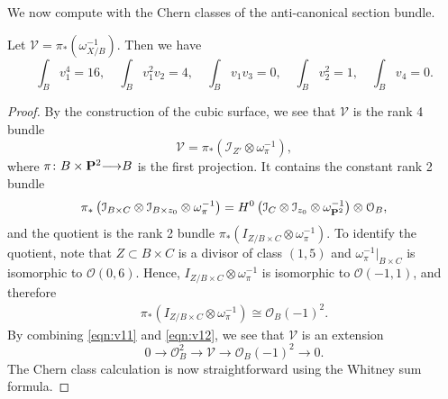 \documentclass[12pt,reqno]{amsart}
\renewcommand{\to}{{\longrightarrow}}
\numberwithin{equation}{section}
\renewcommand{\O}{\mathcal O}
\begin{document}
We now compute with the Chern classes of the anti-canonical section bundle.
\begin{proposition}\label{lem:v1}
  Let $\mathcal V = \pi_* \left( \omega_{X/B}^{-1} \right)$.
  Then we have
  \[
    \int_{B}v_{1}^{4} = 16, \quad \int_{B}v_{1}^{2}v_{2} = 4,\quad \int_{B}v_{1}v_{3} =0,\quad \int_{B}v_2^{2} = 1,\quad \int_{B}v_{4} = 0.\]
\end{proposition}
\begin{proof}
  By the construction of the cubic surface, we see that $\mathcal V$
  is the rank 4 bundle
\[ \mathcal V = \pi_* (\mathcal I_{Z'} \otimes \omega_{\pi}^{-1}),\]
where $\pi \colon B \times \P^2 \to B$ is the first projection.  It
contains the constant rank 2 bundle
\begin{equation}\label{eqn:v11}
  \pi_*\left( \mathcal I_{B \times C} \otimes \mathcal I_{B \times z_0} \otimes \omega_\pi^{-1} \right) = H^0\left(\mathcal I_{C} \otimes \mathcal I_{z_0} \otimes \omega_{\P^2}^{-1}\right) \otimes \O_{B},
\end{equation}
and the quotient is the rank 2 bundle
$\pi_*\left( I_{Z/B \times C} \otimes \omega_\pi^{-1} \right)$.  To
identify the quotient, note that $Z \subset B \times C$ is a divisor
of class $(1,5)$ and $\omega^{-1}_{\pi}|_{B\times C}$ is isomorphic to
$\O(0,6)$.  Hence, $I_{Z/B \times C} \otimes \omega_\pi^{-1}$ is
isomorphic to $\O(-1,1)$, and therefore
\begin{equation}\label{eqn:v12}
  \begin{split}
    \pi_*\left( I_{Z/B \times C} \otimes \omega_\pi^{-1} \right) \cong \O_{B}(-1)^{2}.
  \end{split}
\end{equation}
By combining \eqref{eqn:v11} and \eqref{eqn:v12}, we see that $\mathcal V$ is an extension
\begin{equation}\label{eqn:V1}
  0 \to \O_{B}^2 \to \mathcal V \to \O_{B}(-1)^2 \to 0.
\end{equation}
The Chern class calculation is now straightforward using the Whitney sum formula.
\end{proof}
\end{document}
